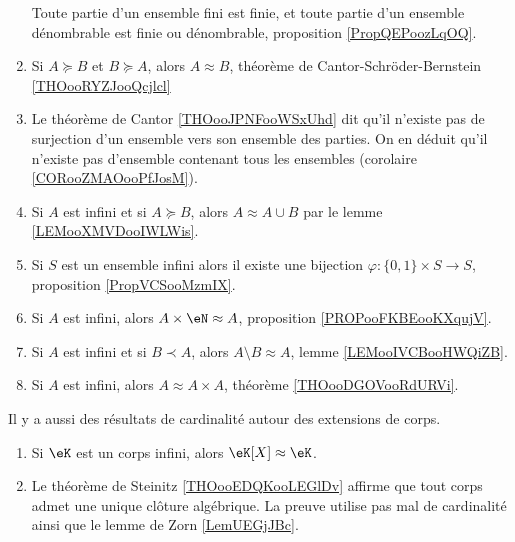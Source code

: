 \begin{enumerate}
	      Toute partie d'un ensemble fini est finie, et toute partie d'un ensemble dénombrable est finie ou dénombrable, proposition \ref{PropQEPoozLqOQ}.
	\item
	      Si \( A\succeq B\) et \( B\succeq A\), alors \( A\approx B\), théorème de Cantor-Schröder-Bernstein \ref{THOooRYZJooQcjlcl}
	\item
	      Le théorème de Cantor \ref{THOooJPNFooWSxUhd} dit qu'il n'existe pas de surjection d'un ensemble vers son ensemble des parties. On en déduit qu'il n'existe pas d'ensemble contenant tous les ensembles (corolaire \ref{CORooZMAOooPfJosM}).
	\item
	      Si \( A\) est infini et si \( A\succeq B\), alors \( A\approx A\cup B\) par le lemme \ref{LEMooXMVDooIWLWis}.
	\item
	      Si \( S\) est un ensemble infini alors il existe une bijection \( \varphi\colon \{ 0,1 \}\times S\to S\), proposition \ref{PropVCSooMzmIX}.
	\item
	      Si \( A\) est infini, alors \( A\times \eN\approx A\), proposition \ref{PROPooFKBEooKXqujV}.
	\item
	      Si \( A\) est infini et si \( B\prec A\), alors \( A\setminus B\approx A\), lemme \ref{LEMooIVCBooHWQiZB}.
	\item
	      Si \( A\) est infini, alors \( A\approx A\times A\), théorème \ref{THOooDGOVooRdURVi}.
\end{enumerate}

Il y a aussi des résultats de cardinalité autour des extensions de corps.
\begin{enumerate}
	\item
	      Si \( \eK\) est un corps infini, alors \( \eK[X]\approx \eK\).
	\item
	      Le théorème de Steinitz \ref{THOooEDQKooLEGlDv} affirme que tout corps admet une unique clôture algébrique. La preuve utilise pas mal de cardinalité ainsi que le lemme de Zorn \ref{LemUEGjJBc}.
\end{enumerate}
